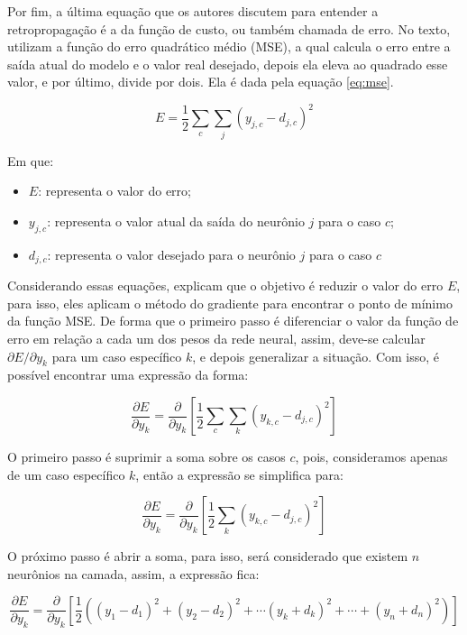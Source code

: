 Por fim, a última equação que os autores discutem para entender a retropropagação é a da função de custo, ou também chamada de erro. No texto, \textcite{BackpropagationArticle} utilizam a função do erro quadrático médio (MSE), a qual calcula o erro entre a saída atual do modelo e o valor real desejado, depois ela eleva ao quadrado esse valor, e por último, divide por dois. Ela é dada pela equação \ref{eq:mse}.

\begin{equation}
    E = \frac{1}{2} \sum_{c} \sum_{j} (y_{j, c} - d_{j, c})^2 
    \label{eq:mse}
\end{equation}

Em que:

\begin{itemize}
    \item $E$: representa o valor do erro;
    \item $y_{j, c}$: representa o valor atual da saída do neurônio $j$ para o caso $c$;
    \item $d_{j, c}$: representa o valor desejado para o neurônio $j$ para o caso $c$
\end{itemize}

Considerando essas equações, \textcite{BackpropagationArticle} explicam que o objetivo é reduzir o valor do erro $E$, para isso, eles aplicam o método do gradiente para encontrar o ponto de mínimo da função MSE. De forma que o primeiro passo é diferenciar o valor da função de erro em relação a cada um dos pesos da rede neural, assim, deve-se calcular $\partial E / \partial y_k$ para um caso específico $k$, e depois generalizar a situação. Com isso, é possível encontrar uma expressão da forma:

\[
    \frac{\partial E}{\partial y_k} = \frac{\partial}{\partial y_k} \left[ \frac{1}{2} \sum_c \sum_k (y_{k, c} - d_{j, c})^2\right]
\]

O primeiro passo é suprimir a soma sobre os casos $c$, pois, consideramos apenas de um caso específico $k$, então a expressão se simplifica para:

\[
    \frac{\partial E}{\partial y_k} = \frac{\partial}{\partial y_k} \left[ \frac{1}{2} \sum_k (y_{k, c} - d_{j, c})^2\right]
\]

O próximo passo é abrir a soma, para isso, será considerado que existem $n$ neurônios na camada, assim, a expressão fica:

\[
    \frac{\partial E}{\partial y_k} = \frac{\partial}{\partial y_k} \left[ \frac{1}{2} \left( (y_1 - d_1)^2 + (y_2 - d_2)^2 + \cdots (y_k + d_k)^2 + \cdots + (y_n + d_n)^2 \right) \right]
\]

